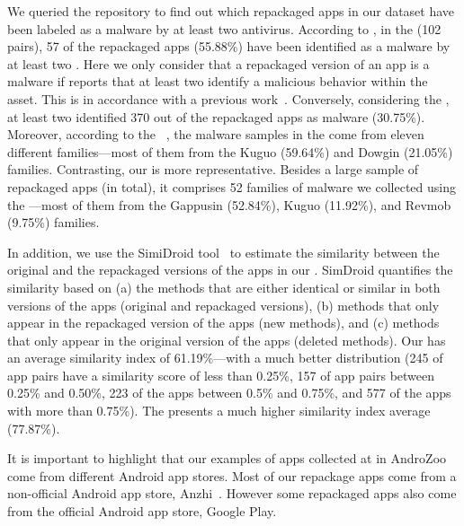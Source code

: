 We queried the \vt repository to find out which repackaged apps in our
dataset have been labeled as a malware by at least two antivirus. According to \vt, in the \sds (102 pairs),
57 of the repackaged apps (55.88\%) have been identified as a malware by at least two
\ses. Here we only consider that a repackaged version of an app is a malware if \vt reports that at least
two \ses identify a malicious behavior within the asset. This is in accordance with a previous work~\cite{vt-label}. Conversely, considering the \cds, at least two \se identified 370 out of the \apps repackaged apps as malware (30.75\%).
Moreover, according to the
\avt~\cite{avclass2-paper}, the malware samples in the \sds come from eleven different families---most of them from the Kuguo (59.64\%) and Dowgin (21.05\%) families.
Contrasting, our \cds is more representative. Besides a large sample of repackaged apps (\apps in total), it
comprises 52 families of malware we collected using the \avt ---most
of them from the Gappusin (52.84\%), Kuguo (11.92\%), and Revmob (9.75\%) families.

In addition, we use the SimiDroid tool~\cite{DBLP:conf/trustcom/0029BK17} to
estimate the similarity between the original and the repackaged versions of the
apps in our \cds. SimDroid quantifies the similarity
based on (a) the methods that are either identical or similar in both versions of the apps (original and repackaged versions),
(b) methods that only appear in the repackaged version of the apps (new methods), and (c) methods that only appear in the
original version of the apps (deleted methods).
Our \cds has an average similarity index of 61.19\%---with a much better distribution (245 of
app pairs have a similarity score of less than 0.25\%, 157 of app pairs
between 0.25\% and 0.50\%, 223 of the apps between 0.5\% and 0.75\%,
and 577 of the apps with more than 0.75\%). The \sds presents a much higher
similarity index average (77.87\%). 

It is important to highlight that our examples of apps collected at in AndroZoo come from different Android app stores. Most of our repackage apps come from a non-official Android app store, Anzhi~\cite{anzhi}. However some repackaged apps also come from the official Android app store, Google Play.




